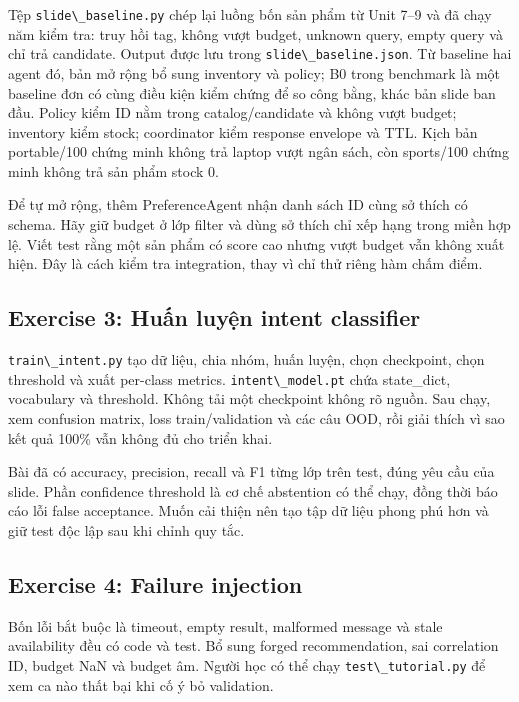 Tệp \passthrough{\lstinline!slide\_baseline.py!} chép lại luồng bốn sản
phẩm từ Unit 7--9 và đã chạy năm kiểm tra: truy hồi tag, không vượt
budget, unknown query, empty query và chỉ trả candidate. Output được lưu
trong \passthrough{\lstinline!slide\_baseline.json!}. Từ baseline hai
agent đó, bản mở rộng bổ sung inventory và policy; B0 trong benchmark là
một baseline đơn có cùng điều kiện kiểm chứng để so công bằng, khác bản
slide ban đầu. Policy kiểm ID nằm trong catalog/candidate và không vượt
budget; inventory kiểm stock; coordinator kiểm response envelope và TTL.
Kịch bản portable/100 chứng minh không trả laptop vượt ngân sách, còn
sports/100 chứng minh không trả sản phẩm stock 0.

Để tự mở rộng, thêm PreferenceAgent nhận danh sách ID cùng sở thích có
schema. Hãy giữ budget ở lớp filter và dùng sở thích chỉ xếp hạng trong
miền hợp lệ. Viết test rằng một sản phẩm có score cao nhưng vượt budget
vẫn không xuất hiện. Đây là cách kiểm tra integration, thay vì chỉ thử
riêng hàm chấm điểm.

\subsection{Exercise 3: Huấn luyện intent
classifier}\label{exercise-3-huux1ea5n-luyux1ec7n-intent-classifier}

\passthrough{\lstinline!train\_intent.py!} tạo dữ liệu, chia nhóm, huấn
luyện, chọn checkpoint, chọn threshold và xuất per-class metrics.
\passthrough{\lstinline!intent\_model.pt!} chứa state\_dict, vocabulary
và threshold. Không tải một checkpoint không rõ nguồn. Sau chạy, xem
confusion matrix, loss train/validation và các câu OOD, rồi giải thích
vì sao kết quả 100\% vẫn không đủ cho triển khai.

Bài đã có accuracy, precision, recall và F1 từng lớp trên test, đúng yêu
cầu của slide. Phần confidence threshold là cơ chế abstention có thể
chạy, đồng thời báo cáo lỗi false acceptance. Muốn cải thiện nên tạo tập
dữ liệu phong phú hơn và giữ test độc lập sau khi chỉnh quy tắc.

\subsection{Exercise 4: Failure
injection}\label{exercise-4-failure-injection}

Bốn lỗi bắt buộc là timeout, empty result, malformed message và stale
availability đều có code và test. Bổ sung forged recommendation, sai
correlation ID, budget NaN và budget âm. Người học có thể chạy
\passthrough{\lstinline!test\_tutorial.py!} để xem ca nào thất bại khi
cố ý bỏ validation.

